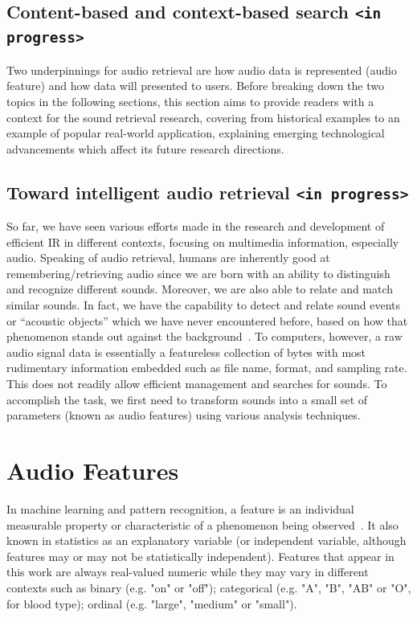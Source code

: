 \subsection{Content-based and context-based search \texttt{<in progress>}}

Two underpinnings for audio retrieval are how audio data is represented (audio feature) and how data will presented to users. Before breaking down the two topics in the following sections, this section aims to provide readers with a context for the sound retrieval research, covering from historical examples to an example of popular real-world application, explaining emerging technological advancements which affect its future research directions.

\subsection{Toward intelligent audio retrieval \texttt{<in progress>}}
So far, we have seen various efforts made in the research and development of efficient IR in different contexts, focusing on multimedia information, especially audio. Speaking of audio retrieval, humans are inherently good at remembering/retrieving audio since we are born with an ability to distinguish and recognize different sounds. Moreover, we are also able to relate and match similar sounds. In fact, we have the capability to detect and relate sound events or “acoustic objects” which we have never encountered before, based on how that phenomenon stands out against the background~\cite{kumar2014}. To computers, however, a raw audio signal data is essentially a featureless collection of bytes with most rudimentary information embedded such as file name, format, and sampling rate. This does not readily allow efficient management and searches for sounds. To accomplish the task, we first need to transform sounds into a small set of parameters (known as audio features) using various analysis techniques. 

\section{Audio Features} 
In machine learning and pattern recognition, a feature is an individual measurable property or characteristic of a phenomenon being observed~\cite{bishop2006}. It also known in statistics as an explanatory variable (or independent variable, although features may or may not be statistically independent). Features that appear in this work are always real-valued numeric while they may vary in different contexts such as binary (e.g. "on" or "off"); categorical (e.g. "A", "B", "AB" or "O", for blood type); ordinal (e.g. "large", "medium" or "small").

